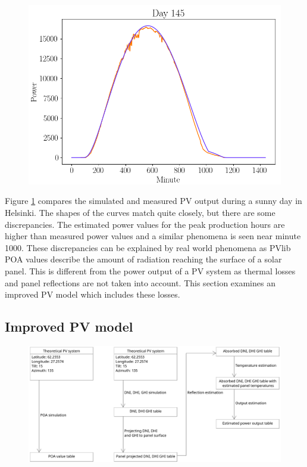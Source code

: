\begin{figure}[h]
\centering
\includegraphics[width=0.7\linewidth]{pics/poa_eval_single_day}
\label{fig-poa_eval_single_day}
\end{figure}

\noindent Figure \ref{fig-poa_eval_single_day} compares the simulated and measured PV output during a sunny day in Helsinki. The shapes of the curves match quite closely, but there are some discrepancies. The estimated power values for the peak production hours are higher than measured power values and a similar phenomena is seen near minute 1000. These discrepancies can be explained by real world phenomena as PVlib POA values describe the amount of radiation reaching the surface of a solar panel. This is different from the power output of a PV system as thermal losses and panel reflections are not taken into account. This section examines an improved PV model which includes these losses.

\newpage

\subsection{Improved PV model}

\begin{figure}[h]
\centering
\includegraphics[width=1.0\linewidth]{pics/uml2}
\label{fig-pv_model}
\end{figure}


